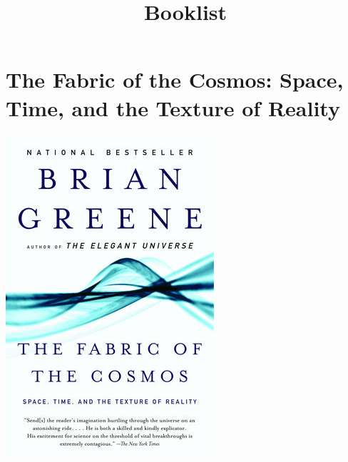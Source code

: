 \documentclass{tufte-handout}
\title{Booklist}
\makeatletter
\newcommand{\varcaption}[2][0pt]{%
  \gsetlength{\@tufte@caption@vertical@offset}{-#1}%
  \gdef\@tufte@stored@varcaption{#2}%
}
\gdef\@tufte@stored@varcaption{} %
\makeatother
\begin{document}
\section*{The Fabric of the Cosmos: Space, Time, and the Texture of Reality}
\begin{marginfigure}
   \includegraphics[width=\linewidth]{images/fabric_of_the_cosmos.jpg}
   \varcaption{\href{https://www.penguinrandomhouse.com/books/71273/the-fabric-of-the-cosmos-by-brian-greene/9780375727207/}{Publisher Link}, \href{https://www.amazon.com/Fabric-Cosmos-Space-Texture-Reality/dp/0375727205}{Amazon Link}}
\end{marginfigure}
\end{document}
